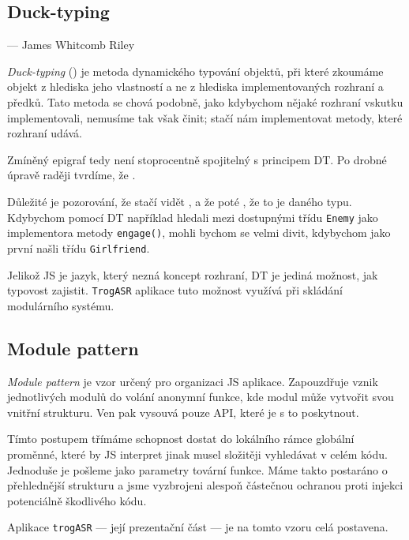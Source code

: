 \subsection{Duck-typing}
\label{ssec:ducktyping}

\epigraph{\sl{}}{--- James Whitcomb Riley}

{\sl Duck-typing} () je metoda dynamického typování objektů, při které zkoumáme objekt z hlediska jeho vlastností a ne z hlediska implementovaných rozhraní a předků. Tato metoda se chová podobně, jako kdybychom nějaké rozhraní vskutku implementovali, nemusíme tak však činit; stačí nám implementovat metody, které rozhraní udává.

Zmíněný epigraf tedy není stoprocentně spojitelný s principem DT. Po drobné úpravě raději tvrdíme, že .

Důležité je pozorování, že stačí vidět , a že poté , že to je daného typu. Kdybychom pomocí DT například hledali mezi dostupnými třídu \verb|Enemy| jako implementora metody \verb|engage()|, mohli bychom se velmi divit, kdybychom jako první našli třídu \verb|Girlfriend|.

Jelikož JS je jazyk, který nezná koncept rozhraní, DT je jediná možnost, jak typovost zajistit. \verb|TrogASR| aplikace tuto možnost využívá při skládání modulárního systému.

\subsection{Module pattern}

{\sl Module pattern} je vzor určený pro organizaci JS aplikace. Zapouzdřuje vznik jednotlivých modulů do volání anonymní funkce, kde modul může vytvořit svou vnitřní strukturu. Ven pak vysouvá pouze API, které je s to poskytnout.

Tímto postupem třímáme schopnost dostat do lokálního rámce globální proměnné, které by JS interpret jinak musel složitěji vyhledávat v celém kódu. Jednoduše je pošleme jako parametry tovární funkce. Máme takto postaráno o přehlednější strukturu a jsme vyzbrojeni alespoň částečnou ochranou proti injekci potenciálně škodlivého kódu.

Aplikace \verb|trogASR| --- její prezentační část --- je na tomto vzoru celá postavena.

